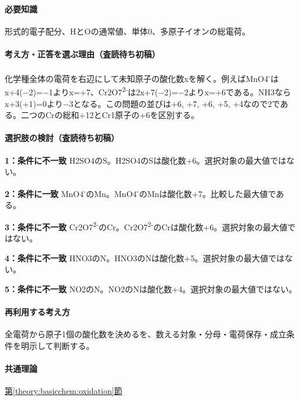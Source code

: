 \paragraph{必要知識} 形式的電子配分、HとOの通常値、単体0、多原子イオンの総電荷。

\paragraph{考え方・正答を選ぶ理由（査読待ち初稿）} 化学種全体の電荷を右辺にして未知原子の酸化数xを解く。例えばMnO4\textsuperscript{-}はx+4(−2)=−1よりx=+7、Cr2O7\textsuperscript{2-}は2x+7(−2)=−2よりx=+6である。NH3ならx+3(+1)=\allowbreak{}0より−3となる。この問題の並びは+6, +7, +6, +5, +4なので2である。二つのCrの総和+12とCr1原子の+6を区別する。

\paragraph{選択肢の検討（査読待ち初稿）}\mbox{}\par

\noindent\textbf{1：条件に不一致} H2SO4のS。H2SO4のSは酸化数+6。選択対象の最大値ではない。\par

\noindent\textbf{2：条件に一致} MnO4\textsuperscript{-}のMn。MnO4\textsuperscript{-}のMnは酸化数+7。比較した最大値である。\par

\noindent\textbf{3：条件に不一致} Cr2O7\textsuperscript{2-}のCr。Cr2O7\textsuperscript{2-}のCrは酸化数+6。選択対象の最大値ではない。\par

\noindent\textbf{4：条件に不一致} HNO3のN。HNO3のNは酸化数+5。選択対象の最大値ではない。\par

\noindent\textbf{5：条件に不一致} NO2のN。NO2のNは酸化数+4。選択対象の最大値ではない。\par

\paragraph{再利用する考え方} 全電荷から原子1個の酸化数を決めるを、数える対象・分母・電荷保存・成立条件を明示して判断する。

\paragraph{共通理論} \hyperref[theory:basicchem:oxidation]{第\ref*{theory:basicchem:oxidation}節}

